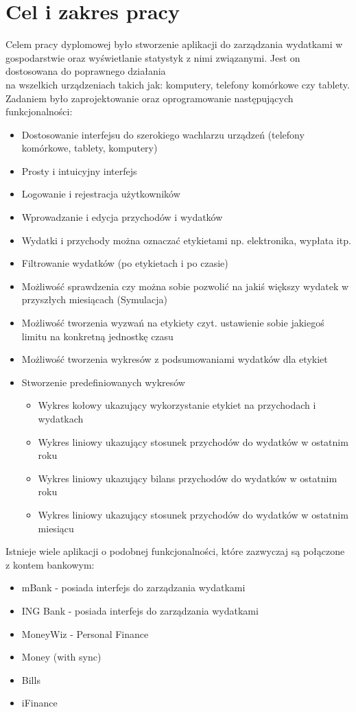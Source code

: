 \documentclass[10pt,titlepage]{article}
\begin{document}
\section{Cel i zakres pracy}
\par Celem pracy dyplomowej było stworzenie aplikacji do zarządzania wydatkami w gospodarstwie oraz wyświetlanie statystyk z nimi związanymi. Jest on dostosowana do poprawnego działania\\ na wszelkich urządzeniach takich jak: komputery, telefony komórkowe czy tablety. Zadaniem było zaprojektowanie oraz oprogramowanie następujących funkcjonalności:
\begin{itemize}
  \item Dostosowanie interfejsu do szerokiego wachlarzu urządzeń (telefony komórkowe, tablety, komputery)
  \item Prosty i intuicyjny interfejs
  \item Logowanie i rejestracja użytkowników
  \item Wprowadzanie i edycja przychodów i wydatków
  \item Wydatki i przychody można oznaczać etykietami np. elektronika, wypłata itp.
  \item Filtrowanie wydatków (po etykietach i po czasie)
  \item Możliwość sprawdzenia czy można sobie pozwolić na jakiś większy wydatek w przyszłych miesiącach (Symulacja)
  \item Możliwość tworzenia wyzwań na etykiety czyt. ustawienie sobie jakiegoś limitu na konkretną jednostkę czasu
  \item Możliwość tworzenia wykresów z podsumowaniami wydatków dla etykiet
  \item Stworzenie predefiniowanych wykresów
    \begin{itemize}
      \item Wykres kołowy ukazujący wykorzystanie etykiet na przychodach i wydatkach
      \item Wykres liniowy ukazujący stosunek przychodów do wydatków w ostatnim roku
      \item Wykres liniowy ukazujący bilans przychodów do wydatków w ostatnim roku
      \item Wykres liniowy ukazujący stosunek przychodów do wydatków w ostatnim miesiącu
    \end{itemize}
\end{itemize}
Istnieje wiele aplikacji o podobnej funkcjonalności, które zazwyczaj są połączone z kontem bankowym:
\begin{itemize}
  \item mBank - posiada interfejs do zarządzania wydatkami
  \item ING Bank - posiada interfejs do zarządzania wydatkami
  \item MoneyWiz - Personal Finance
  \item Money (with sync)
  \item Bills
  \item iFinance
\end{itemize}
\end{document}
